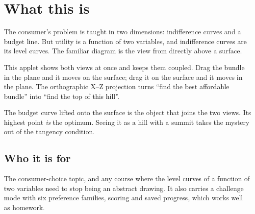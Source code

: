 \documentclass[11pt,a4paper]{appletmanual}
\begin{document}

\manualtoc
\thispagestyle{empty}
\clearpage
\setcounter{page}{1}

\section{What this is}

The consumer's problem is taught in two dimensions: indifference curves and a
budget line. But utility is a function of two variables, and indifference
curves are its level curves. The familiar diagram is the view from directly
above a surface.

This applet shows both views at once and keeps them coupled. Drag the bundle in
the plane and it moves on the surface; drag it on the surface and it moves in
the plane. The orthographic X--Z projection turns ``find the best affordable
bundle'' into ``find the top of this hill''.


\begin{amkey}
The budget curve lifted onto the surface is the object that joins the two
views. Its highest point \emph{is} the optimum. Seeing it as a hill with a
summit takes the mystery out of the tangency condition.
\end{amkey}

\subsection{Who it is for}

The consumer-choice topic, and any course where the level curves of a function
of two variables need to stop being an abstract drawing. It also carries a
challenge mode with six preference families, scoring and saved progress, which
works well as homework.



\end{document}
